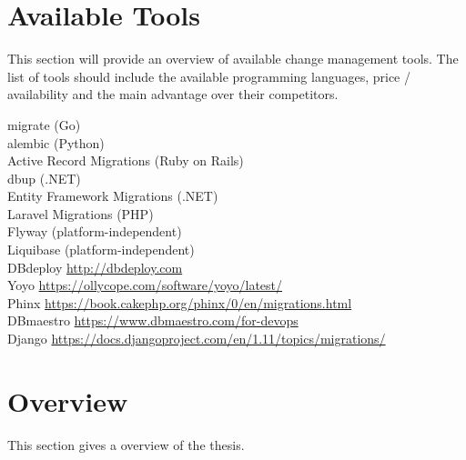 \section{Available Tools}%
This section will provide an overview of available change management tools.
The list of tools should include the available programming languages, price / availability
and the main advantage over their competitors.

migrate (Go)\\
alembic (Python)\\
Active Record Migrations (Ruby on Rails)\\
dbup (.NET)\\
Entity Framework Migrations (.NET)\\
Laravel Migrations (PHP)\\
Flyway (platform-independent)\\
Liquibase (platform-independent)\\
DBdeploy \url{http://dbdeploy.com}\\
Yoyo \url{https://ollycope.com/software/yoyo/latest/}\\
Phinx \url{https://book.cakephp.org/phinx/0/en/migrations.html}\\
DBmaestro \url{https://www.dbmaestro.com/for-devops}\\
Django \url{https://docs.djangoproject.com/en/1.11/topics/migrations/}



\section{Overview}%
This section gives a overview of the thesis.




\newpage